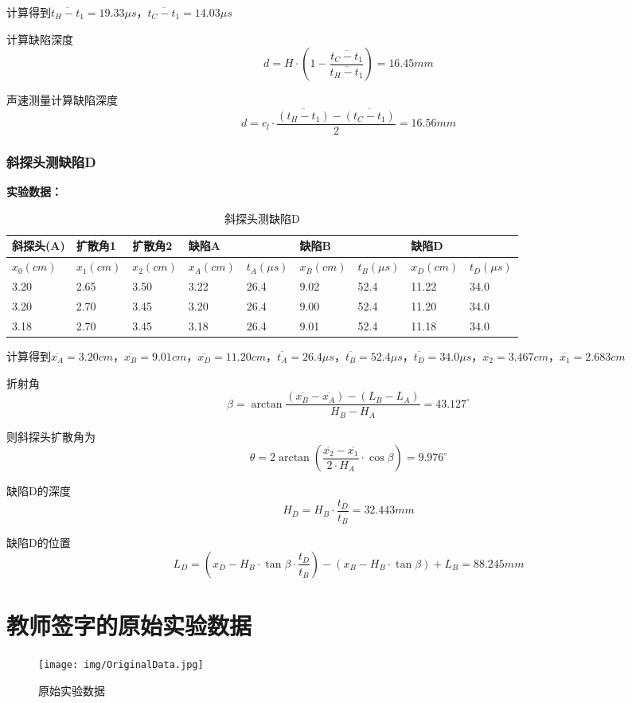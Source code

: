 \documentclass[UTF8]{ctexart}
\newcommand\df[2]{\dfrac{#1}{#2}}
\begin{document}
计算得到\(\overline{t_H-t_1}=19.33\mu s\)，\(\overline{t_C-t_1}=14.03\mu s\)

计算缺陷深度\[d=H \cdot (1-\df{\overline{t_C-t_1}}{\overline{t_H-t_1}})=16.45mm\]


声速测量计算缺陷深度\[d=c_l \cdot \df{\overline{(t_H-t_1)}-\overline{(t_C-t_1)}}{2}=16.56mm\]

\subsubsection{斜探头测缺陷D}

\textbf{实验数据：}

\begin{table}[!ht]
    \centering
    \caption{斜探头测缺陷D}
    \begin{tabular}{|l|l|l|l|l|l|l|l|l|}
    \hline
        \textbf{斜探头(A)} & \textbf{扩散角1} & \textbf{扩散角2} & \textbf{缺陷A} &  & \textbf{缺陷B} &  & \textbf{缺陷D} &  \\ \hline
        \(x_0(cm)\) & \(x_1(cm)\) & \(x_2(cm)\) & \(x_A(cm)\) & \(t_A(\mu s)\) & \(x_B(cm)\) & \(t_B(\mu s)\) & \(x_D(cm)\) & \(t_D(\mu s)\) \\ \hline
        3.20 & 2.65 & 3.50 & 3.22 & 26.4 & 9.02 & 52.4 & 11.22 & 34.0 \\ \hline
        3.20 & 2.70 & 3.45 & 3.20 & 26.4 & 9.00 & 52.4 & 11.20 & 34.0 \\ \hline
        3.18 & 2.70 & 3.45 & 3.18 & 26.4 & 9.01 & 52.4 & 11.18 & 34.0 \\ \hline
    \end{tabular}
    \label{table3}
\end{table}

计算得到\(\overline{x_A}=3.20cm\)，\(\overline{x_B}=9.01cm\)，\(\overline{x_D}=11.20cm\)，\(\overline{t_A}=26.4\mu s\)，\(\overline{t_B}=52.4\mu s\)，\(\overline{t_D}=34.0\mu s\)，\(\overline{x_2}=3.467cm\)，\(\overline{x_1}=2.683cm\)

折射角\[\beta=\arctan\df{(\overline{x_B}-\overline{x_A})-(L_B-L_A)}{H_B-H_A}=43.127^{\circ}\]

则斜探头扩散角为\[\theta=2\arctan(\df{\overline{x_2}-\overline{x_1}}{2\cdot H_A}\cdot\cos\beta)=9.976^{\circ}\]

缺陷D的深度\[H_D=H_B\cdot\df{t_D}{t_B}=32.443mm\]

缺陷D的位置\[L_D=(x_D-H_B\cdot\tan\beta\cdot\df{t_D}{t_B})-(x_B-H_B\cdot\tan\beta)+L_B=88.245mm\]

\newpage
\section{教师签字的原始实验数据}

\begin{figure}[h]
    \centering
    \texttt{[image: img/OriginalData.jpg]}
    \caption{原始实验数据}
    \label{fig:raw_data_1}
\end{figure}
\end{document}

